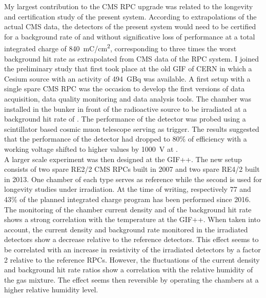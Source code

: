 	My largest contribution to the CMS RPC upgrade was related to the longevity and certification study of the present system. According to extrapolations of the actual CMS data, the detectors of the present system would need to be certified for a background rate of  and without significative loss of performance at a total integrated charge of \SI{840}{mC/cm^2}, corresponding to three times the worst background hit rate as extrapolated from CMS data of the RPC system. I joined the preliminary study that first took place at the old \acl{GIF} of CERN in which a Cesium source with an activity of \SI{494}{GBq} was available. A first setup with a single spare CMS RPC was the occasion to develop the first versions of data acquisition, data quality monitoring and data analysis tools. The chamber was installed in the bunker in front of the radioactive source to be irradiated at a background hit rate of . The performance of the detector was probed using a scintillator based cosmic muon telescope serving as trigger. The results suggested that the performance of the detector had dropped to 80\% of efficiency with a working voltage shifted to higher values by \SI{1000}{V} at .\\
	A larger scale experiment was then designed at the GIF++. The new setup consists of two spare RE2/2 CMS RPCs built in 2007 and two spare RE4/2 built in 2013. One chamber of each type serves as reference while the second is used for longevity studies under irradiation. At the time of writing, respectively 77 and 43\% of the planned integrated charge program has been performed since 2016. The monitoring of the chamber current density and of the background hit rate shows a strong correlation with the temperature at the GIF++. When taken into account, the current density and background rate monitored in the irradiated detectors show a decrease relative to the reference detectors. This effect seems to be correlated with an increase in resistivity of the irradiated detectors by a factor 2 relative to the reference RPCs. However, the fluctuations of the current density and background hit rate ratios show a correlation with the relative humidity of the gas mixture. The effect seems then reversible by operating the chambers at a higher relative humidity level.\\
